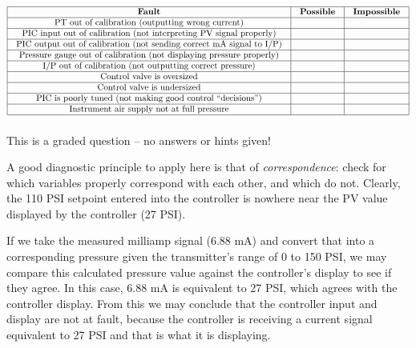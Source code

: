 $$\vbox{\offinterlineskip
\halign{\strut
\vrule \quad\hfil # \ \hfil & 
\vrule \quad\hfil # \ \hfil & 
\vrule \quad\hfil # \ \hfil \vrule \cr
\noalign{\hrule}
%
{\bf Fault} & {\bf Possible} & {\bf Impossible} \cr
%
\noalign{\hrule}
%
PT out of calibration (outputting wrong current) &  &  \cr
%
\noalign{\hrule}
%
PIC input out of calibration (not interpreting PV signal properly) &  &  \cr
%
\noalign{\hrule}
%
PIC output out of calibration (not sending correct mA signal to I/P) &  &  \cr
%
\noalign{\hrule}
%
Pressure gauge out of calibration (not displaying pressure properly) &  &  \cr
%
\noalign{\hrule}
%
I/P out of calibration (not outputting correct pressure) &  &  \cr
%
\noalign{\hrule}
%
Control valve is oversized &  &  \cr
%
\noalign{\hrule}
%
Control valve is undersized &  &  \cr
%
\noalign{\hrule}
%
PIC is poorly tuned (not making good control ``decisions'') &  &  \cr
%
\noalign{\hrule}
%
Instrument air supply not at full pressure &  &  \cr
%
\noalign{\hrule}
} %
}$$ %







This is a graded question -- no answers or hints given!







A good diagnostic principle to apply here is that of {\it correspondence}: check for which variables properly correspond with each other, and which do not.  Clearly, the 110 PSI setpoint entered into the controller is nowhere near the PV value displayed by the controller (27 PSI).

If we take the measured milliamp signal (6.88 mA) and convert that into a corresponding pressure given the transmitter's range of 0 to 150 PSI, we may compare this calculated pressure value against the controller's display to see if they agree.  In this case, 6.88 mA is equivalent to 27 PSI, which agrees with the controller display.  From this we may conclude that the controller input and display are not at fault, because the controller is receiving a current signal equivalent to 27 PSI and that is what it is displaying.  

